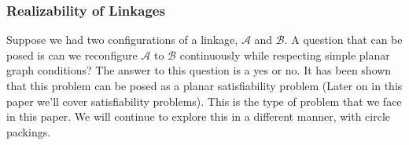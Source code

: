 \subsubsection{Realizability of Linkages}
Suppose we had two configurations of a linkage, $\mathcal{A}$ and $\mathcal{B}$.  A question that can be posed is can we reconfigure $\mathcal{A}$ to $\mathcal{B}$ continuously while respecting simple planar graph conditions?  The answer to this question is a yes or no.  It has been shown that this problem can be posed as a planar satisfiability problem \cite{Breu19983,mulzer2008minimum} (Later on in this paper we'll cover satisfiability problems).  This is the type of problem that we face in this paper.  We will continue to explore this in a different manner, with circle packings.
